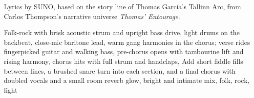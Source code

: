
\begin{notes}
Lyrics by SUNO, based on the story line of Thomas García's Tallinn Arc, from Carlos Thompson's narrative universe \emph{Thomas’ Entourage}.
\end{notes}
\begin{style}
Folk-rock with brisk acoustic strum and upright bass drive, light drums on the backbeat, close-mic baritone lead, warm gang harmonies in the chorus; verse rides fingerpicked guitar and walking bass, pre-chorus opens with tambourine lift and rising harmony, chorus hits with full strum and handclaps, Add short fiddle fills between lines, a brushed snare turn into each section, and a final chorus with doubled vocals and a small room reverb glow, bright and intimate mix, folk, rock, light
\end{style}
